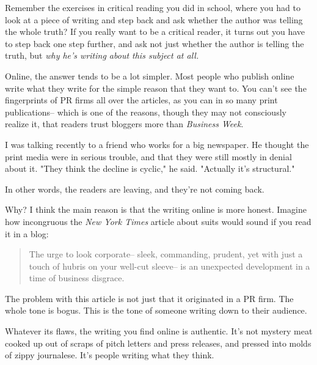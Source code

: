 Remember the
                  exercises in critical reading you did in school, where you had
                  to look at a piece of writing and step back and ask whether
                  the author was telling the whole truth? If you really want to
                  be a critical reader, it turns out you have to step back one
                  step further, and ask not just whether the author is telling
                  the truth, but
                  \emph{why he's writing about this subject at all.}

Online, the answer tends to be a lot simpler.
                  Most people who publish online write what they write for the
                  simple reason that they want to. You can't see the
                  fingerprints of PR firms all over the articles, as you can in
                  so many print publications-- which is one of the reasons,
                  though they may not consciously realize it, that readers trust
                  bloggers more than \emph{Business Week}.

I was
                  talking recently to a friend who works for a big newspaper. He
                  thought the print media were in serious trouble, and that they
                  were still mostly in denial about it. "They think the decline
                  is cyclic," he said. "Actually it's structural."

In
                  other words, the readers are leaving, and they're not coming
                  back.


                  Why? I think the main reason is that the writing online is
                  more honest. Imagine how incongruous the
                  \emph{New York Times} article about suits would sound if you
                  read it in a blog:
                  \begin{quote}

                    The urge to look corporate-- sleek, commanding, prudent, yet
                    with just a touch of hubris on your well-cut sleeve-- is an
                    unexpected development in a time of business disgrace.
                  
\end{quote}

                  The problem with this article is not just that it originated
                  in a PR firm. The whole tone is bogus. This is the tone of
                  someone writing down to their audience.

Whatever
                  its flaws, the writing you find online is authentic. It's not
                  mystery meat cooked up out of scraps of pitch letters and
                  press releases, and pressed into molds of zippy journalese.
                  It's people writing what they think.

